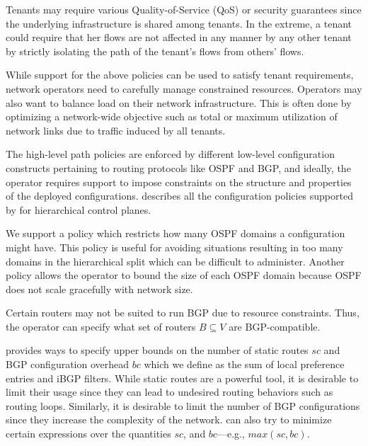  Tenants may require various
Quality-of-Service (QoS) or security guarantees since the 
underlying infrastructure is shared among tenants. In the extreme, a
tenant could require that her flows are not affected in any manner
by any other tenant by strictly isolating the path of the tenant's
flows from others' flows. 

While support for the above policies can be used to satisfy tenant 
requirements, network operators need to 
carefully manage constrained resources. Operators may also want
to balance load on their network infrastructure. This is often done
by optimizing a network-wide objective such as total or maximum
utilization of network links due to traffic induced by all tenants. 

The high-level path policies are enforced by different low-level 
configuration constructs pertaining to routing protocols like OSPF and BGP, 
and ideally, the operator requires support to impose constraints on the structure 
and properties of the deployed configurations. 
describes all the configuration policies supported by \name for hierarchical 
control planes. 


We support a policy which restricts how many OSPF domains 
a configuration might have. This policy is useful for 
avoiding situations resulting in too
many domains in the hierarchical split which can be difficult to
administer. Another policy allows the operator to bound 
the size of each OSPF domain because OSPF does
not scale gracefully with network size.  

 Certain 
	routers may not be suited to run BGP due to resource
	constraints. Thus, the operator can specify what set of 
	routers $B\subseteq V$ are BGP-compatible. 
	

\name provides ways to specify upper bounds on the number of
static routes $sc$ and 
BGP configuration overhead $bc$ which we define as the 
sum of local preference entries and iBGP filters.
While static routes are a powerful tool, 
it is desirable to limit their usage since they
can lead to undesired routing behaviors such as routing loops.
Similarly, it is desirable to limit the number of BGP configurations
since they increase the complexity of the network.
\name can  also try to minimize 
certain expressions over the quantities $sc$, and $bc$---e.g., $max(sc, bc)$. 

